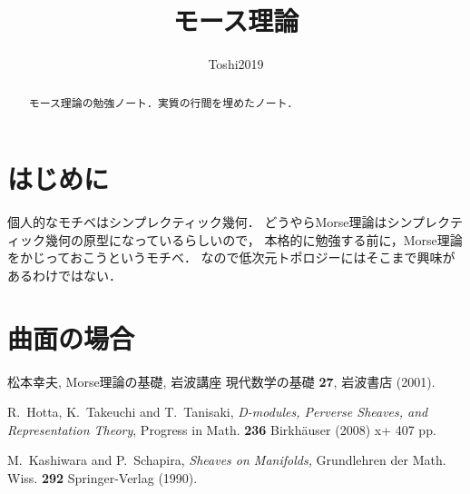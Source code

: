 \documentclass[12pt,leqno]{article}
\theoremstyle{definition}
\numberwithin{equation}{subsection}
\begin{document}
\title{モース理論}
\author{Toshi2019}


\maketitle
\begin{abstract}
モース理論の勉強ノート．実質\cite{M01}の行間を埋めたノート．
\end{abstract}

\section*{はじめに}
個人的なモチベはシンプレクティック幾何．
どうやらMorse理論はシンプレクティック幾何の原型になっているらしいので，
本格的に勉強する前に，Morse理論をかじっておこうというモチベ．
なので低次元トポロジーにはそこまで興味があるわけではない．

\section{曲面の場合}


\providecommand{\bysame}{\leavevmode\hbox to3em{\hrulefill}\thinspace}
\begin{thebibliography}{15}

 松本幸夫, Morse理論の基礎, 岩波講座 現代数学の基礎 {\bf 27}, 岩波書店 (2001).

 R.~Hotta, K.~Takeuchi and T.~Tanisaki,
\emph{D-modules, Perverse Sheaves, and Representation Theory},
Progress in Math.  {\bf 236} Birkh\"auser (2008) x+ 407 pp.

 M.~Kashiwara and P.~Schapira,
{\em Sheaves on Manifolds,}
\ake Grundlehren der Math. Wiss. {\bf 292} Springer-Verlag (1990).

\end{thebibliography}
\end{document}
